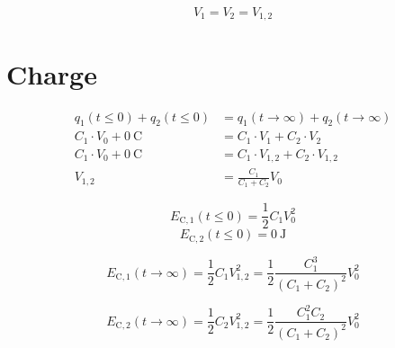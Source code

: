 \documentclass{article}[11pt]
\begin{document}
\begin{equation}
V_{\mathrm{1}}=V_{\mathrm{2}}=V_{\mathrm{1,2}}
\end{equation}

\section{Charge}

\begin{equation}
\begin{split}
q_{\mathrm{1}}(t\leq0)   + q_{\mathrm{2}}(t\leq0) & = q_{\mathrm{1}}(t\rightarrow \infty)+ q_{\mathrm{2}}(t\rightarrow \infty) \\
C_1 \cdot V_{\mathrm{0}} + \SI{0}{\coulomb}       & = C_1 \cdot V_{\mathrm{1}}           + C_2 \cdot V_{\mathrm{2}}            \\
C_1 \cdot V_{\mathrm{0}} + \SI{0}{\coulomb}       & = C_1 \cdot V_{\mathrm{1,2}}         + C_2 \cdot V_{\mathrm{1,2}}          \\
                             V_{\mathrm{1,2}}     & = \frac{C_1}{C_1+C_2}  V_{\mathrm{0}}
\end{split}
\end{equation}

\begin{equation}
E_{\mathrm{C,1}}(t\leq0) = \frac{1}{2} C_1 V_{\mathrm{0}}^2
\end{equation}
\begin{equation}
E_{\mathrm{C,2}}(t\leq0) = \SI{0}{\joule}
\end{equation}

\begin{equation}
E_{\mathrm{C,1}}(t\rightarrow \infty) = \frac{1}{2} C_1 V_{\mathrm{1,2}}^2 = \frac{1}{2} \frac{C_1^3}{(C_1+C_2)^2} V_{\mathrm{0}}^2
\end{equation}

\begin{equation}
E_{\mathrm{C,2}}(t\rightarrow \infty) = \frac{1}{2} C_2 V_{\mathrm{1,2}}^2 = \frac{1}{2} \frac{C_1^2 C_2}{(C_1+C_2)^2} V_{\mathrm{0}}^2
\end{equation}
\end{document}
